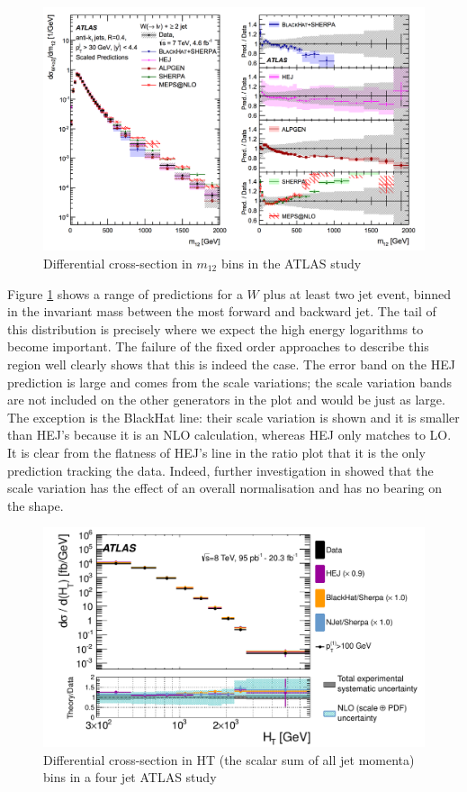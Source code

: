 \begin{figure}[t]
\centering
\includegraphics[scale=0.4]{Images/wjets_HEJ.png} 
\caption{Differential cross-section in $m_{12}$ bins in the ATLAS study \cite{Aad2014a}}
\label{fig:wjet}
\end{figure} 

Figure \ref{fig:wjet} shows a range of predictions for a $W$ plus at least two jet event, binned in the invariant mass between the most forward and backward jet. The tail of this distribution is precisely where we expect the high energy logarithms to become important. The failure of the fixed order approaches to describe this region well clearly shows that this is indeed the case. The error band on the HEJ prediction is large and comes from the scale variations; the scale variation bands are not included on the other generators in the plot and would be just as large. The exception is the BlackHat line: their scale variation is shown and it is smaller than HEJ's because it is an NLO calculation, whereas HEJ only matches to LO. It is clear from the flatness of HEJ's line in the ratio plot that it is the only prediction tracking the data. Indeed, further investigation in \cite{Andersen2016} showed that the scale variation has the effect of an overall normalisation and has no bearing on the shape.  

\begin{figure}[t]
\centering
\includegraphics[scale=0.8]{Images/4jet_hej.pdf} 
\caption{Differential cross-section in HT (the scalar sum of all jet momenta) bins in a four jet ATLAS study \cite{Aad2015}}
\label{fig:4jetan}
\end{figure}


